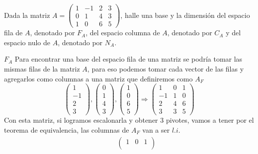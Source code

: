 \item Dada la matriz 
    \(
        A = \left(\begin{smallmatrix}
            1 & -1 & 2 & 3 \\
            0 & 1 & 4 & 3 \\
            1 & 0 & 6 & 5
        \end{smallmatrix}\right)
    \),
    halle una base y la dimensión del espacio fila de \(A\), denotado por \(F_A\), del espacio columna de \(A\), denotado por \(C_A\) y del espacio nulo de \(A\), denotado por \(N_A\). \\
    \ResetCases{}
    \begin{mathcase}{\(F_A\)}
        Para encontrar una base del espacio fila de una matriz se podría tomar las mismas filas de la matriz \(A\), para eso podemos tomar cada vector 
        de las filas y agregarlos como columnas a una matriz que definiremos como \(A_F\)
        \[
            \begin{pmatrix}
                1 \\ -1 \\ 2 \\ 3
            \end{pmatrix},
            \begin{pmatrix}
                0 \\ 1 \\ 4 \\ 3 
            \end{pmatrix},
            \begin{pmatrix}
                1 \\ 0 \\ 6 \\ 5
            \end{pmatrix}
            \Rightarrow
            \begin{pmatrix}
                1 & 0 & 1 \\
                -1 & 1 & 0 \\
                2 & 4 & 6 \\
                3 & 3 & 5
            \end{pmatrix}
        \]
        Con esta matriz, si logramos escalonarla y obtener 3 pivotes, vamos a tener por el teorema de equivalencia, las columnas de \(A_F\) van a ser \(l.i\).
        \[
            \begin{aligned}
                &\phantom{\sim}
                \begin{pmatrix}
                    1 & 0 & 1 \\

\end{pmatrix}
\end{aligned}\]
\end{mathcase}

